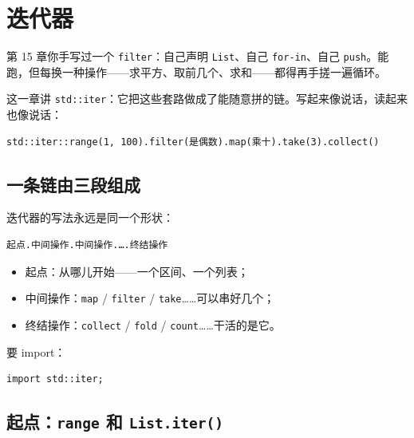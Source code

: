 \chapter{迭代器}
\label{ch:17}

第 15 章你手写过一个 \texttt{filter}：自己声明 \texttt{List}、自己 \texttt{for-in}、自己 \texttt{push}。能跑，但每换一种操作——求平方、取前几个、求和——都得再手搓一遍循环。

这一章讲 \texttt{std:\allowbreak{}:\allowbreak{}iter}：它把这些套路做成了能随意拼的链。写起来像说话，读起来也像说话：

\par
\medskip
\begin{lstlisting}[style=chali]
std::iter::range(1, 100).filter(是偶数).map(乘十).take(3).collect()
\end{lstlisting}
\par
\medskip

\section{一条链由三段组成}

迭代器的写法永远是同一个形状：

\par
\medskip
\begin{lstlisting}[style=chali]
起点.中间操作.中间操作.….终结操作
\end{lstlisting}
\par
\medskip

\begin{itemize}

\item 起点：从哪儿开始——一个区间、一个列表；

\item 中间操作：\texttt{map} / \texttt{filter} / \texttt{take}……可以串好几个；

\item 终结操作：\texttt{collect} / \texttt{fold} / \texttt{count}……干活的是它。

\end{itemize}

要 import：

\par
\medskip
\begin{lstlisting}[style=chali]
import std::iter;
\end{lstlisting}
\par
\medskip

\section{起点：\texttt{range} 和 \texttt{List.\allowbreak{}iter(\allowbreak{})\allowbreak{}}}

